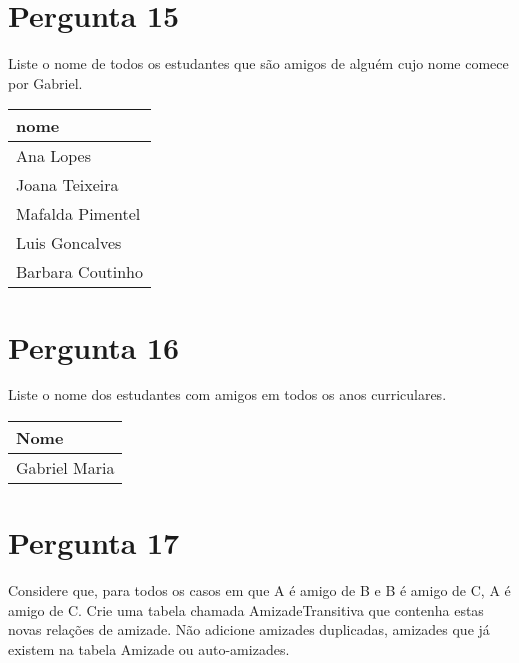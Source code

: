 {\section{Pergunta 15}
Liste o nome de todos os estudantes que são amigos de alguém cujo nome comece por Gabriel.
\begin{center} \begin{tabular}{l}
    \textbf{nome}    \\ \hline
    Ana Lopes        \\
    Joana Teixeira   \\
    Mafalda Pimentel \\
    Luis Goncalves   \\
    Barbara Coutinho
\end{tabular} \end{center}


\section{Pergunta 16}
Liste o nome dos estudantes com amigos em todos os anos curriculares.
\begin{center} \begin{tabular}{l}
    \textbf{Nome}    \\ \hline
    Gabriel Maria
\end{tabular} \end{center}


\section{Pergunta 17}
Considere que, para todos os casos em que A é amigo de B e B é amigo de C, A é amigo de C. Crie uma tabela chamada AmizadeTransitiva que contenha estas novas relações de amizade. Não adicione amizades duplicadas, amizades que já existem na tabela Amizade ou auto-amizades.

}

